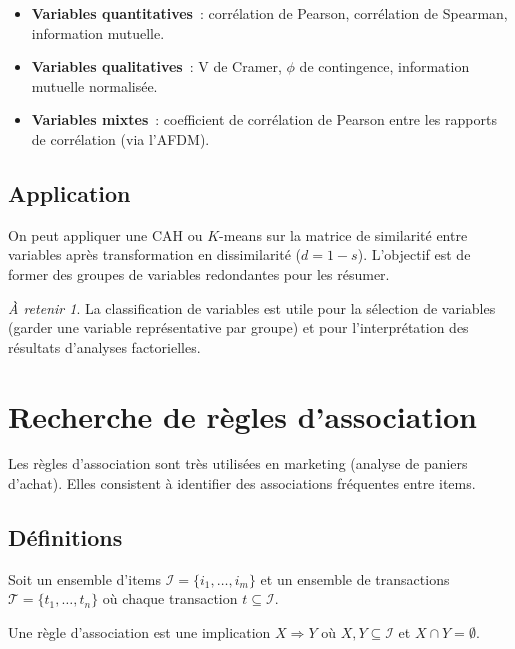 \documentclass[a4paper,11pt]{article}
\theoremstyle{definition}
\theoremstyle{remark}
\newtheorem*{important}{\`A retenir}
\begin{document}
\begin{itemize}
  \item \textbf{Variables quantitatives}~: corr\'elation de Pearson,
    corr\'elation de Spearman, information mutuelle.
  \item \textbf{Variables qualitatives}~: V de Cramer, $\phi$ de
    contingence, information mutuelle normalis\'ee.
  \item \textbf{Variables mixtes}~: coefficient de corr\'elation
    de Pearson entre les rapports de corr\'elation (via l'AFDM).
\end{itemize}

\subsection{Application}

On peut appliquer une CAH ou $K$-means sur la matrice de similarit\'e
entre variables apr\`es transformation en dissimilarit\'e
($d = 1 - s$). L'objectif est de former des groupes de variables
redondantes pour les r\'esumer.

\begin{important}
  La classification de variables est utile pour la s\'election de
  variables (garder une variable repr\'esentative par groupe) et
  pour l'interpr\'etation des r\'esultats d'analyses factorielles.
\end{important}

\section{Recherche de r\`egles d'association}

Les r\`egles d'association sont tr\`es utilis\'ees en marketing
(analyse de paniers d'achat). Elles consistent \`a identifier des
associations fr\'equentes entre items.

\subsection{D\'efinitions}

Soit un ensemble d'items $\mathcal{I} = \{i_1, \dots, i_m\}$ et un
ensemble de transactions $\mathcal{T} = \{t_1, \dots, t_n\}$ o\`u
chaque transaction $t \subseteq \mathcal{I}$.

Une r\`egle d'association est une implication $X \Rightarrow Y$ o\`u
$X, Y \subseteq \mathcal{I}$ et $X \cap Y = \emptyset$.
\end{document}
